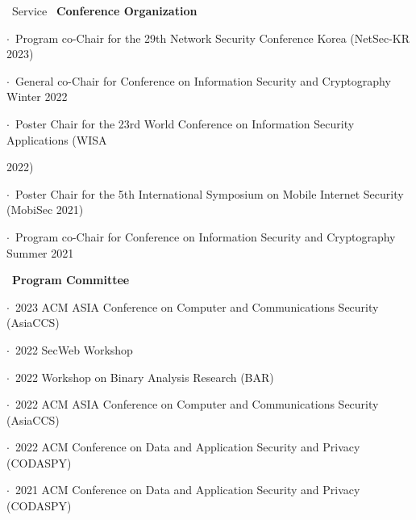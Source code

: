 \documentclass{resume} %
\begin{document}
\begin{rSection}{\faGenderless~Service}
    \textbullet~{\bf Conference Organization} \\
		\strut\hspace{1cm}$\cdot$~Program co-Chair for the 29th Network Security Conference Korea (NetSec-KR 2023)\\
		\strut\hspace{1cm}$\cdot$~General co-Chair for Conference on Information Security and Cryptography Winter 2022\\
        \strut\hspace{1cm}$\cdot$~Poster Chair for the 23rd World Conference on Information Security Applications (WISA\\\strut\hspace{1cm}2022)\\
        \strut\hspace{1cm}$\cdot$~Poster Chair for the 5th International Symposium on Mobile Internet Security (MobiSec 2021)\\
        \strut\hspace{1cm}$\cdot$~Program co-Chair for Conference on Information Security and Cryptography Summer 2021

    \textbullet~{\bf Program Committee} \\
		\strut\hspace{1cm}$\cdot$~2023 ACM ASIA Conference on Computer and Communications Security (AsiaCCS)\\
		\strut\hspace{1cm}$\cdot$~2022 SecWeb Workshop\\
		\strut\hspace{1cm}$\cdot$~2022 Workshop on Binary Analysis Research (BAR)\\
    	\strut\hspace{1cm}$\cdot$~2022 ACM ASIA Conference on Computer and Communications Security (AsiaCCS)\\
    	\strut\hspace{1cm}$\cdot$~2022 ACM Conference on Data and Application Security and Privacy (CODASPY)\\
        \strut\hspace{1cm}$\cdot$~2021 ACM Conference on Data and Application Security and Privacy (CODASPY)


\end{rSection}
\end{document}
